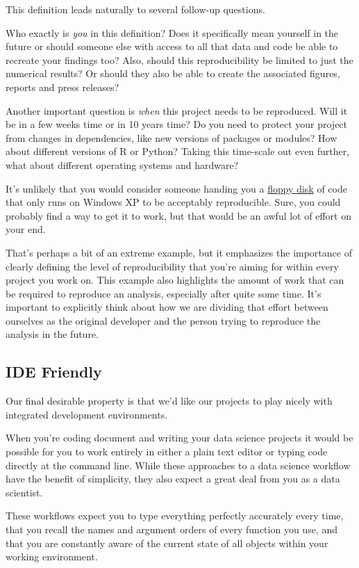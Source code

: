 \documentclass[
  letterpaper,
  DIV=11,
  numbers=noendperiod]{scrreprt}
\begin{document}
This definition leads naturally to several follow-up questions.

Who exactly is \emph{you} in this definition? Does it specifically mean
yourself in the future or should someone else with access to all that
data and code be able to recreate your findings too? Also, should this
reproducibility be limited to just the numerical results? Or should they
also be able to create the associated figures, reports and press
releases?

Another important question is \emph{when} this project needs to be
reproduced. Will it be in a few weeks time or in 10 years time? Do you
need to protect your project from changes in dependencies, like new
versions of packages or modules? How about different versions of R or
Python? Taking this time-scale out even further, what about different
operating systems and hardware?

It's unlikely that you would consider someone handing you a
\href{https://en.wikipedia.org/wiki/Floppy_disk}{floppy disk} of code
that only runs on Windows XP to be acceptably reproducible. Sure, you
could probably find a way to get it to work, but that would be an awful
lot of effort on your end.

That's perhaps a bit of an extreme example, but it emphasizes the
importance of clearly defining the level of reproducibility that you're
aiming for within every project you work on. This example also
highlights the amount of work that can be required to reproduce an
analysis, especially after quite some time. It's important to explicitly
think about how we are dividing that effort between ourselves as the
original developer and the person trying to reproduce the analysis in
the future.

\subsection{IDE Friendly}\label{ide-friendly}

Our final desirable property is that we'd like our projects to play
nicely with integrated development environments.

When you're coding document and writing your data science projects it
would be possible for you to work entirely in either a plain text editor
or typing code directly at the command line. While these approaches to a
data science workflow have the benefit of simplicity, they also expect a
great deal from you as a data scientist.

These workflows expect you to type everything perfectly accurately every
time, that you recall the names and argument orders of every function
you use, and that you are constantly aware of the current state of all
objects within your working environment.
\end{document}
